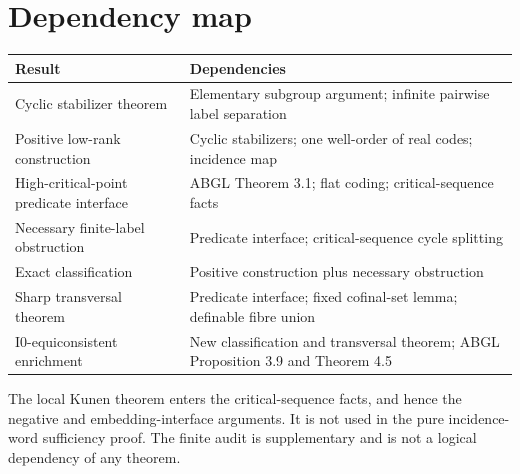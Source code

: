 \documentclass[11pt,letterpaper]{article}
\theoremstyle{definition}
\numberwithin{equation}{section}
\newcommand{\Izero}{\mathrm{I0}}
\begin{document}
\section{Dependency map}\label{app:dependencies}

\begin{center}
\small
\begin{tabularx}{\textwidth}{@{}P{.39\textwidth}Y@{}}
\toprule
Result & Dependencies \\
\midrule
Cyclic stabilizer theorem & Elementary subgroup argument; infinite pairwise label separation \\
Positive low-rank construction & Cyclic stabilizers; one well-order of real codes; incidence map \\
High-critical-point predicate interface & ABGL Theorem 3.1; flat coding; critical-sequence facts \\
Necessary finite-label obstruction & Predicate interface; critical-sequence cycle splitting \\
Exact classification & Positive construction plus necessary obstruction \\
Sharp transversal theorem & Predicate interface; fixed cofinal-set lemma; definable fibre union \\
$\Izero$-equiconsistent enrichment & New classification and transversal theorem; ABGL Proposition 3.9 and Theorem 4.5 \\
\bottomrule
\end{tabularx}
\end{center}

The local Kunen theorem enters the critical-sequence facts, and hence the negative and embedding-interface arguments. It is not used in the pure incidence-word sufficiency proof. The finite audit is supplementary and is not a logical dependency of any theorem.
\end{document}
